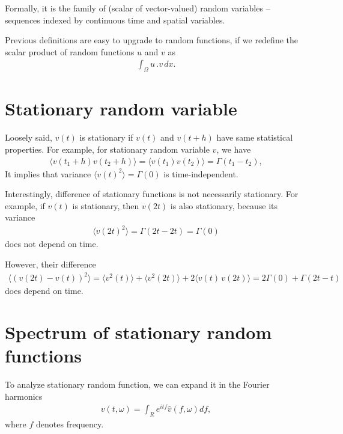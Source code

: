Formally, it is the family of (scalar of vector-valued) random variables -- sequences indexed by continuous time and spatial variables.

\bigskip

Previous definitions are easy to upgrade to random functions, if we redefine the scalar product of random functions $u$ and $v$ as
\begin{align}
\int_{\Omega} u \,. v \, dx.
\end{align}

\section{Stationary random variable}
Loosely said, $v(t)$ is stationary if $v(t)$ and $v(t+h)$ have same statistical properties.
For example, for stationary random variable $v$, we have
\begin{align*}
\langle v(t_1+h) v(t_2 + h) \rangle = \langle v(t_1) v(t_2) \rangle = \Gamma(t_1 - t_2),
\end{align*}
It implies that variance $\langle v(t)^2 \rangle = \Gamma(0)$ is time-independent.

Interestingly, difference of stationary functions is not necessarily stationary. 
For example, if $v(t)$ is stationary, then $v(2t)$ is also stationary, because its variance
\begin{align*}
\langle v(2t)^2 \rangle = \Gamma(2t - 2t) = \Gamma(0)
\end{align*}
does not depend on time.

However, their difference
\begin{align}
\langle (v(2t) - v(t))^2 \rangle = \langle v^2(t) \rangle + \langle v^2(2t) \rangle + 2\langle v(t)\,v(2t) \rangle = 2\Gamma(0) + \Gamma(2t - t)
\end{align} 
does depend on time.

\section{Spectrum of stationary random functions}

To analyze stationary random function, we can expand it in the Fourier harmonics
\begin{align}
v(t,\omega) = \int_{R} e^{itf} \hat{v}(f,\omega) df,
\end{align}
where $f$ denotes frequency.


